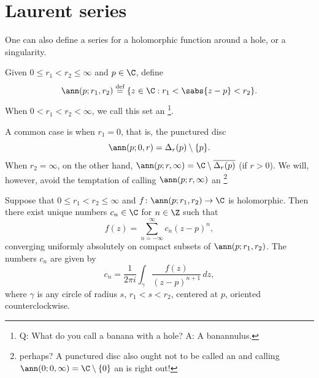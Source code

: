 \section{Laurent series}

One can also define a series for a holomorphic function around a hole, or a singularity.

\begin{defn}
Given $0 \leq r_1 < r_2 \leq \infty$ and $p \in \C$, define
%
\begin{equation*}
\ann(p;r_1,r_2)
\overset{\text{def}}{=}
\{ z \in \C : r_1 < \sabs{z - p} < r_2 \} .
\end{equation*}
When $0 < r_1 < r_2 < \infty$, we call this set an
\emph{}\footnote{%
Q\@: What do you call a banana with a hole?
A\@: A banannulus.}.
\end{defn}

A common case is when $r_1 = 0$, that is,
the punctured disc
\begin{equation*}
\ann(p;0,r) = \Delta_r(p) \setminus \{ p \} .
\end{equation*}
When $r_2 = \infty$, on the other hand,
$\ann(p;r,\infty) = \C \setminus \overline{\Delta_{r}(p)}$ (if $r > 0$).  We will,
however, avoid the temptation of calling $\ann(p;r,\infty)$ an %
\footnote{ perhaps?  A punctured disc also ought not to be
called an  and calling $\ann(0;0,\infty) = \C \setminus
\{ 0 \}$ an  is right out!}

\begin{thm}
%
%
\label{thm:laurent}%
Suppose that $0 \leq r_1 < r_2 \leq \infty$ and
$f \colon \ann(p;r_1,r_2) \to \C$ is holomorphic.
Then there exist unique numbers $c_n \in \C$ for $n \in \Z$ such that
%
\begin{equation*}
f(z) = \sum_{n=-\infty}^{\infty} c_n {(z-p)}^n ,
\end{equation*}
converging uniformly absolutely on compact subsets of
$\ann(p;r_1,r_2)$.  The numbers $c_n$ are given by
\begin{equation*}
c_n = 
\frac{1}{2\pi i}
\int_{\gamma}
\frac{f(z)}{{(z-p)}^{n+1}}
\,
dz  ,
\end{equation*}
where $\gamma$ is any circle of radius $s$, $r_1 < s < r_2$, centered at
$p$, oriented counterclockwise.
\end{thm}

